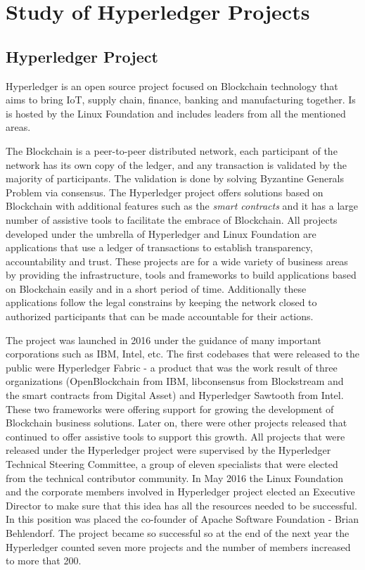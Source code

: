 \chapter{Study of Hyperledger Projects}
\label{chapter:chapter2}

\section{Hyperledger Project}
\label{sec:chapter1-section1}
Hyperledger is an open source project focused on Blockchain technology that aims to bring IoT, supply chain, finance, banking and manufacturing together. Is is hosted by the Linux Foundation and includes leaders from all the mentioned areas.

The Blockchain is a peer-to-peer distributed network, each participant of the network has its own copy of the ledger, and any transaction is validated by the majority of participants. The validation is done by solving Byzantine Generals Problem via consensus.
The Hyperledger project offers solutions based on Blockchain with additional features such as the \emph{smart contracts} and it has a large number of assistive tools to facilitate the embrace of Blockchain.
All projects developed under the umbrella of Hyperledger and Linux Foundation are applications that use a ledger of transactions to establish transparency, accountability and trust. These projects are for a wide variety of business areas by providing the infrastructure, tools and frameworks to build applications based on Blockchain easily and in a short period of time. Additionally these applications follow the legal constrains by keeping the network closed to authorized participants that can be made accountable for their actions.

The project was launched in 2016 under the guidance of many important corporations such as IBM, Intel, etc. The first codebases that were released to the public were Hyperledger Fabric - a product that was the work result of three organizations (OpenBlockchain from IBM, libconsensus from Blockstream and the smart contracts from Digital Asset) and Hyperledger Sawtooth from Intel. 
These two frameworks were offering support for growing the development of Blockchain business solutions. Later on, there were other projects released that continued to offer assistive tools to support this growth. All projects that were released under the Hyperledger project were supervised by the Hyperledger Technical Steering Committee, a group of eleven specialists that were elected from the technical contributor community.
In May 2016 the Linux Foundation and the corporate members involved in Hyperledger project elected an Executive Director to make sure that this idea has all the resources needed to be successful. In this position was placed the co-founder of Apache Software Foundation - Brian Behlendorf. 
The project became so successful so at the end of the next year the Hyperledger counted seven more projects and the number of members increased to more that 200.

